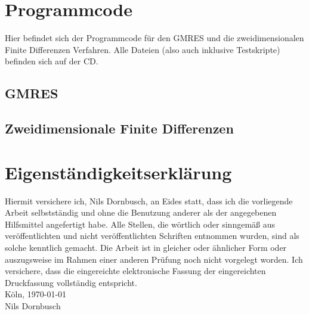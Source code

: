 \documentclass[12pt,a4paper]{scrartcl}
\numberwithin{equation}{section} %
\theoremstyle{definition}
\theoremstyle{plain}
\begin{document}
\section{Programmcode}
Hier befindet sich der Programmcode für den GMRES und die zweidimensionalen Finite Differenzen Verfahren. Alle Dateien (also auch inklusive Testskripte) befinden sich auf der CD.
\subsection{GMRES}
\label{Gmrescode}

\subsection{Zweidimensionale Finite Differenzen}
\label{FDV2Dcode}

\newpage
{}
\setcounter{lofdepth}{2}
\listoffigures
\newpage
{}


\newpage
\section*{Eigenständigkeitserklärung}
Hiermit versichere ich, Nils Dornbusch, an Eides statt, dass ich die vorliegende Arbeit selbstständig und ohne die Benutzung anderer als der angegebenen Hilfsmittel angefertigt habe. Alle Stellen, die wörtlich oder sinngemäß aus veröffentlichten und nicht veröffentlichten Schriften entnommen wurden, sind als solche kenntlich gemacht. Die Arbeit ist in gleicher oder ähnlicher Form oder auszugsweise im Rahmen einer anderen Prüfung noch nicht vorgelegt worden. Ich versichere, dass die eingereichte elektronische Fassung der eingereichten Druckfassung vollständig entspricht.
\\[\bigskipamount]
Köln, \today
\\[2\bigskipamount]
Nils Dornbusch
\end{document}
